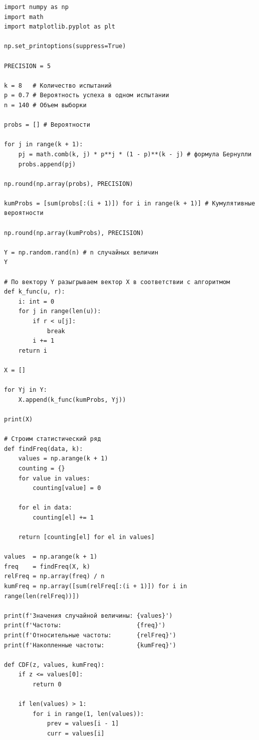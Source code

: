 \documentclass[a4paper, 14pt]{extarticle}
\begin{document}
\lstset{style=mystyle, language=Python, extendedchars=\true}

\begin{lstlisting}
import numpy as np
import math
import matplotlib.pyplot as plt

np.set_printoptions(suppress=True)

PRECISION = 5

k = 8   # Количество испытаний
p = 0.7 # Вероятность успеха в одном испытании
n = 140 # Объем выборки

probs = [] # Вероятности

for j in range(k + 1):
    pj = math.comb(k, j) * p**j * (1 - p)**(k - j) # формула Бернулли
    probs.append(pj)

np.round(np.array(probs), PRECISION)

kumProbs = [sum(probs[:(i + 1)]) for i in range(k + 1)] # Кумулятивные вероятности

np.round(np.array(kumProbs), PRECISION)

Y = np.random.rand(n) # n случайных величин
Y

# По вектору Y разыгрываем вектор X в соответствии с алгоритмом
def k_func(u, r):
    i: int = 0
    for j in range(len(u)):
        if r < u[j]:
            break
        i += 1
    return i

X = []

for Yj in Y:
    X.append(k_func(kumProbs, Yj))

print(X)

# Строим статистический ряд
def findFreq(data, k):
    values = np.arange(k + 1)
    counting = {}
    for value in values:
        counting[value] = 0

    for el in data:
        counting[el] += 1
    
    return [counting[el] for el in values]

values  = np.arange(k + 1)
freq    = findFreq(X, k)
relFreq = np.array(freq) / n
kumFreq = np.array([sum(relFreq[:(i + 1)]) for i in range(len(relFreq))])

print(f'Значения случайной величины: {values}')
print(f'Частоты:                     {freq}')
print(f'Относительные частоты:       {relFreq}')
print(f'Накопленные частоты:         {kumFreq}')

def CDF(z, values, kumFreq):
    if z <= values[0]:
        return 0
    
    if len(values) > 1:
        for i in range(1, len(values)):
            prev = values[i - 1]
            curr = values[i]


\end{lstlisting}
\end{document}
